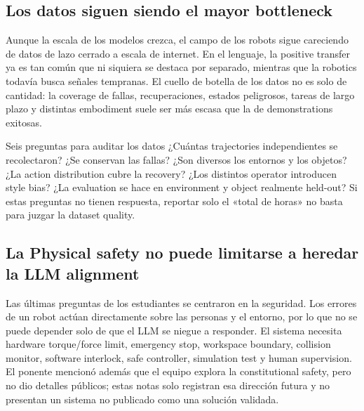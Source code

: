 \documentclass[a4paper]{article}
\begin{document}

\subsection{Los datos siguen siendo el mayor bottleneck}

Aunque la escala de los modelos crezca, el campo de los robots sigue careciendo de datos de lazo cerrado a escala de internet. En el lenguaje, la positive transfer ya es tan común que ni siquiera se destaca por separado, mientras que la robotics todavía busca señales tempranas. El cuello de botella de los datos no es solo de cantidad: la coverage de fallas, recuperaciones, estados peligrosos, tareas de largo plazo y distintas embodiment suele ser más escasa que la de demonstrations exitosas.

\begin{knowledgebox}{Seis preguntas para auditar los datos}
¿Cuántas trajectories independientes se recolectaron? ¿Se conservan las fallas? ¿Son diversos los entornos y los objetos? ¿La action distribution cubre la recovery? ¿Los distintos operator introducen style bias? ¿La evaluation se hace en environment y object realmente held-out? Si estas preguntas no tienen respuesta, reportar solo el «total de horas» no basta para juzgar la dataset quality.
\end{knowledgebox}

\subsection{La Physical safety no puede limitarse a heredar la LLM alignment}

Las últimas preguntas de los estudiantes se centraron en la seguridad. Los errores de un robot actúan directamente sobre las personas y el entorno, por lo que no se puede depender solo de que el LLM se niegue a responder. El sistema necesita hardware torque/force limit, emergency stop, workspace boundary, collision monitor, software interlock, safe controller, simulation test y human supervision. El ponente mencionó además que el equipo explora la constitutional safety, pero no dio detalles públicos; estas notas solo registran esa dirección futura y no presentan un sistema no publicado como una solución validada.
\end{document}
